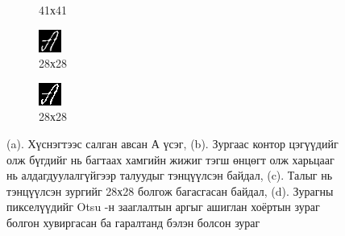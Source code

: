 \begin{figure}[ht]
\begin{subfigure}{0.24\textwidth}
		\caption{41х41}
		\label{fig:letter_a_cropped}
	\end{subfigure}
	\begin{subfigure}{0.24\textwidth}
		\includegraphics[width=0.9\linewidth]{images/letter_a_resized}
		\caption{28х28}
		\label{fig:letter_a_resized}
	\end{subfigure}
	\begin{subfigure}{0.24\textwidth}
		\includegraphics[width=0.9\linewidth]{images/letter_a_final}
		\caption{28х28}
		\label{fig:letter_a_final}
	\end{subfigure}

	\caption{(a). Хүснэгтээс салган авсан А үсэг, (b). Зургаас контор цэгүүдийг олж бүгдийг нь багтаах хамгийн жижиг тэгш өнцөгт олж харьцааг нь алдагдуулалгүйгээр талуудыг тэнцүүлсэн байдал, (c). Талыг нь тэнцүүлсэн зургийг 28х28 болгож багасгасан байдал, (d). Зурагны пикселүүдийг Otsu -н зааглалтын аргыг ашиглан хоёртын зураг болгон хувиргасан ба гаралтанд бэлэн болсон зураг}
	\label{fig:letter_a}
\end{figure}

